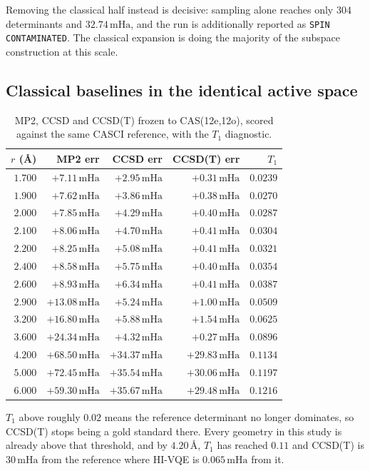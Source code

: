 \documentclass[11pt,a4paper]{article}
\newcommand{\mHa}{\ensuremath{\,\mathrm{mHa}}}
\newcommand{\Ang}{\ensuremath{\,\text{\AA}}}
\newcommand{\code}[1]{\texttt{\small #1}}
\begin{document}
Removing the classical half instead is decisive: sampling alone reaches only
$304$ determinants and $32.74\mHa$, and the run is additionally reported as
\code{SPIN CONTAMINATED}. The classical expansion is doing the majority of the
subspace construction at this scale.

\subsection{Classical baselines in the identical active space}

\begin{table}[htbp]
\centering
\caption{MP2, CCSD and CCSD(T) frozen to CAS(12e,12o), scored against the same
CASCI reference, with the $T_1$ diagnostic.}
\label{tab:classical}
\small
\begin{tabular}{rrrrr}
\toprule
$r$ (\AA) & MP2 err & CCSD err & CCSD(T) err & $T_1$ \\
\midrule
$1.700$ & $+7.11\mHa$  & $+2.95\mHa$  & $+0.31\mHa$  & $0.0239$ \\
$1.900$ & $+7.62\mHa$  & $+3.86\mHa$  & $+0.38\mHa$  & $0.0270$ \\
$2.000$ & $+7.85\mHa$  & $+4.29\mHa$  & $+0.40\mHa$  & $0.0287$ \\
$2.100$ & $+8.06\mHa$  & $+4.70\mHa$  & $+0.41\mHa$  & $0.0304$ \\
$2.200$ & $+8.25\mHa$  & $+5.08\mHa$  & $+0.41\mHa$  & $0.0321$ \\
$2.400$ & $+8.58\mHa$  & $+5.75\mHa$  & $+0.40\mHa$  & $0.0354$ \\
$2.600$ & $+8.93\mHa$  & $+6.34\mHa$  & $+0.41\mHa$  & $0.0387$ \\
$2.900$ & $+13.08\mHa$ & $+5.24\mHa$  & $+1.00\mHa$  & $0.0509$ \\
$3.200$ & $+16.80\mHa$ & $+5.88\mHa$  & $+1.54\mHa$  & $0.0625$ \\
$3.600$ & $+24.34\mHa$ & $+4.32\mHa$  & $+0.27\mHa$  & $0.0896$ \\
$4.200$ & $+68.50\mHa$ & $+34.37\mHa$ & $+29.83\mHa$ & $0.1134$ \\
$5.000$ & $+72.45\mHa$ & $+35.54\mHa$ & $+30.06\mHa$ & $0.1197$ \\
$6.000$ & $+59.30\mHa$ & $+35.67\mHa$ & $+29.48\mHa$ & $0.1216$ \\
\bottomrule
\end{tabular}
\end{table}

$T_1$ above roughly $0.02$ means the reference determinant no longer dominates,
so CCSD(T) stops being a gold standard there. Every geometry in this study is
already above that threshold, and by $4.20\Ang$, $T_1$ has reached $0.11$ and
CCSD(T) is $30\mHa$ from the reference where HI-VQE is $0.065\mHa$ from it.
\end{document}

